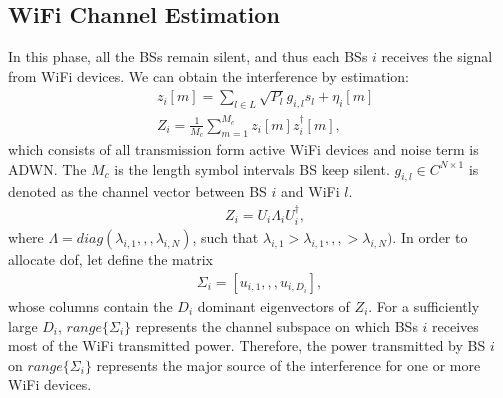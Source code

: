 \documentclass[12pt, onecolumn]{IEEEtran}
\begin{document}
\subsection{WiFi Channel Estimation}
In this phase, all the BSs remain silent, and thus each BSs $i$  receives the signal from WiFi devices. We can obtain the interference by estimation:
\begin{equation}
    \begin{aligned}
        & z_{i}[m] = \sum_{l\in{}L} \sqrt{P_{l}}g_{i,l}s_{l} + \eta_{i}[m] \\
        & Z_{i} = \frac{1}{M_{c}}\sum_{m=1}^{M_{c}} z_{i}[m]z_{i}^{\dag}[m],
    \end{aligned}
\end{equation}
which consists of all transmission form active WiFi devices and noise term  is ADWN. The $M_{c}$ is the length symbol intervals BS keep silent. $g_{i,l}\in{}C^{N\times{}1}$ is denoted as the channel vector between  BS $i$ and WiFi $l$. 
\begin{equation}
    \begin{aligned}
        & Z_{i} = U_{i}\Lambda_{i}U^{\dag}_{i},
    \end{aligned}
\end{equation}
where $\Lambda = diag(\lambda_{i,1},,,\lambda_{i,N})$, such that $\lambda_{i,1}>\lambda_{i,1},,,>\lambda_{i,N})$.  In order to  allocate dof, let define the matrix
\begin{equation}
    \begin{aligned}
        \Sigma_{i} = [u_{i,1},,,u_{i,D_{i}}],
    \end{aligned}
\end{equation}
whose columns contain the $D_{i}$ dominant eigenvectors of $Z_{i}$. For a sufficiently large $D_{i}$, $range\{\Sigma_{i}\}$ represents the channel subspace on which BSs $i$ receives most of the WiFi transmitted power. Therefore, the power transmitted by BS $i$  on $range\{\Sigma_{i}\}$ represents the major source of the interference for one or more WiFi devices.






%


\end{document}
